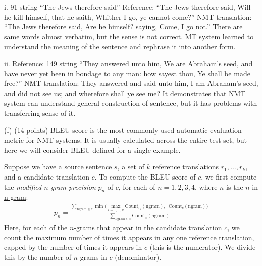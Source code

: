 \documentclass{article}
\begin{document}
	i. 91 string “The Jews therefore said”
	Reference: “The Jews therefore said, Will he kill himself, that he saith, Whither I go, ye cannot come?”
	NMT translation: “The Jews therefore said, Are he himself? saying, Come, I go not.”
	There are same words almost verbatim, but the sense is not correct.
	MT system learned to understand the meaning of the sentence and rephrase it into another form.
	
	ii. Reference: 149 string “They answered unto him, We are Abraham’s seed, and have never yet been in bondage to any man: how sayest thou, Ye shall be made free?”
	NMT translation: They answered and said unto him, I am Abraham’s seed, and did not see us; and wherefore shall ye see me?
	It demonstrates that NMT system can understand general construction of sentence, but it has problems with transferring sense of it.
	
	
	
	\bigbreak
	(f) (14 points)
	BLEU score is the most commonly used automatic evaluation metric for NMT systems. It is usually calculated across the entire test set, but here we will consider BLEU defined for a single example.
	
	
	Suppose we have a source sentence $s$, a set of $k$ reference translations $r_1,\dots,r_k$, and a candidate translation $c$. To compute the BLEU score of $c$, we first compute the \textit{modified $n$-gram precision} $p_n$ of $c$, for each of $n=1,2,3,4$, where $n$ is the $n$ in \href{https://en.wikipedia.org/wiki/N-gram}{n-gram}:
	\begin{align}
		p_n = \frac{ \displaystyle \sum_{\text{ngram} \in c} \min \bigg( \max_{i=1,\dots,k} \text{Count}_{r_i}(\text{ngram}), \enspace \text{Count}_{c}(\text{ngram}) \bigg) }{\displaystyle \sum_{\text{ngram}\in c} \text{Count}_{c}(\text{ngram})}
	\end{align}
	Here, for each of the $n$-grams that appear in the candidate translation $c$, we count the maximum number of times it appears in any one reference translation, capped by the number of times it appears in $c$ (this is the numerator). We divide this by the number of $n$-grams in $c$ (denominator). \newline 
	
	
	
\end{document}
